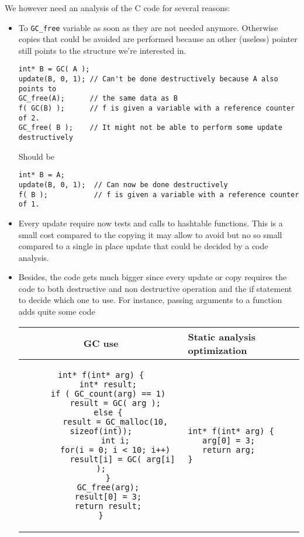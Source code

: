 \documentclass[12pt,a4paper]{article}
\newcommand{\cl}[1]{\texttt{#1}}
\begin{document}
We however need an analysis of the C code for several reasons:
\begin{itemize}
\item To \cl{GC\_free} variable as soon as they are not needed anymore. Otherwise copies that could be avoided are performed because an other (useless) pointer still points to the structure we're interested in.
\begin{lstlisting}
int* B = GC( A );
update(B, 0, 1); // Can't be done destructively because A also points to
GC_free(A);      // the same data as B
f( GC(B) );      // f is given a variable with a reference counter of 2.
GC_free( B );    // It might not be able to perform some update destructively
\end{lstlisting}
Should be
\begin{lstlisting}
int* B = A;
update(B, 0, 1);  // Can now be done destructively
f( B );           // f is given a variable with a reference counter of 1.
\end{lstlisting}
\item Every update require now tests and calls to hashtable functions. This is a small cost compared to the copying it may allow to avoid but no so small compared to a single in place update that could be decided by a code analysis.
\item Besides, the code gets much bigger since every update or copy requires the code to both destructive and non destructive operation and the if statement to decide which one to use. For instance, passing arguments to a function adds quite some code
\begin{center}
\begin{tabular}{|c||l|}
\hline
GC use & Static analysis optimization  \\ \hline
\begin{minipage}{10cm}
\begin{lstlisting}
int* f(int* arg) {
   int* result;
   if ( GC_count(arg) == 1)
      result = GC( arg );
   else {
      result = GC_malloc(10, sizeof(int));
      int i;
      for(i = 0; i < 10; i++)
         result[i] = GC( arg[i] );
   }
   GC_free(arg);
   result[0] = 3;
   return result;
}
\end{lstlisting}
\end{minipage}
&
\begin{lstlisting}
int* f(int* arg) {
   arg[0] = 3;
   return arg;
}
\end{lstlisting} \\ \hline
\end{tabular}
\end{center}

\end{itemize}
\end{document}
